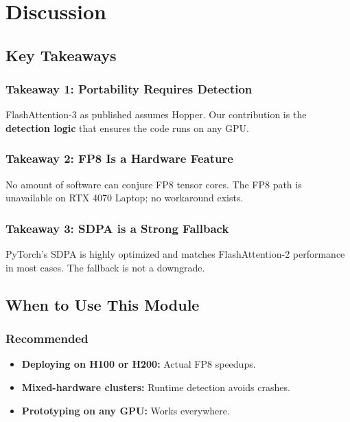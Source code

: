 
\section{Discussion}

\subsection{Key Takeaways}

\subsubsection{Takeaway 1: Portability Requires Detection}

FlashAttention-3 as published assumes Hopper. Our contribution is the 
\textbf{detection logic} that ensures the code runs on any GPU.

\subsubsection{Takeaway 2: FP8 Is a Hardware Feature}

No amount of software can conjure FP8 tensor cores. The FP8 path is 
unavailable on RTX 4070 Laptop; no workaround exists.

\subsubsection{Takeaway 3: SDPA is a Strong Fallback}

PyTorch's SDPA is highly optimized and matches FlashAttention-2 performance 
in most cases. The fallback is not a downgrade.

\subsection{When to Use This Module}

\subsubsection{Recommended}

\begin{itemize}
\item \textbf{Deploying on H100 or H200:} Actual FP8 speedups.
\item \textbf{Mixed-hardware clusters:} Runtime detection avoids crashes.
\item \textbf{Prototyping on any GPU:} Works everywhere.

\end{itemize}
